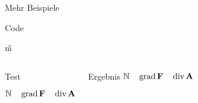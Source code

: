 \begin{frame}[fragile]{Mehr Beispiele}
  \begin{block}{Code}
    \begin{lstverbatim}
    \RenewDocumentCommand\v{m}{}
    \NewDocumentCommand{}
    \NewDocumentCommand{} %
    \AtBeginDocument %
    {       
      \RenewDocumentCommand{}
    }
    \NewDocumentCommmand{} %
    \end{lstverbatim}
  \end{block}
  \begin{columns}[T]
    \begin{block}{Test}
      \begin{lstverbatim}
      $ \setN \quad \grad \v{F} \quad \div \v{A} $ \\
      \end{lstverbatim}
    \end{block}
    \begin{block}{Ergebnis}
      $ \setN \quad \grad \v{F} \quad \div \v{A} $ \\
    \end{block}
  \end{columns}
\end{frame}
